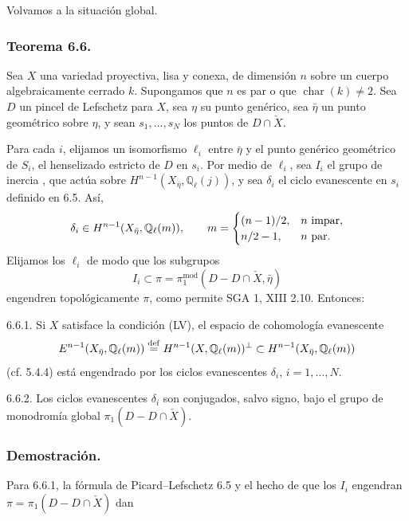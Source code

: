 Volvamos a la situación global.

\subsubsection*{Teorema 6.6.}

Sea $X$ una variedad proyectiva, lisa y conexa, de dimensión $n$ sobre
un cuerpo algebraicamente cerrado $k$. Supongamos que $n$ es par o que
$\operatorname{char}(k)\ne2$. Sea $D$ un pincel de Lefschetz para $X$,
sea $\eta$ su punto genérico, sea $\bar\eta$ un punto geométrico sobre
$\eta$, y sean $s_1,\ldots,s_N$ los puntos de $D\cap\check X$.

\pageoriginale

Para cada $i$, elijamos un isomorfismo $\ell_i$ entre $\bar\eta$ y el
punto genérico geométrico de $S_i$, el henselizado estricto de $D$ en
$s_i$. Por medio de $\ell_i$, sea $I_i$ el grupo de inercia
, que actúa sobre
$H^{n-1}(X_{\bar\eta},\mathbb Q_\ell(j))$, y sea $\delta_i$ el ciclo
evanescente en $s_i$ definido en 6.5. Así,
\[
\delta_i\in
\sisi{H^{n-1}(X,\mathbb Q_\ell(m)}
{H^{n-1}(X_{\bar\eta},\mathbb Q_\ell(m))},
\qquad
m=\begin{cases}
(n-1)/2,& n\text{ impar},\\
n/2-1,& n\text{ par}.
\end{cases}
\]
Elijamos los $\ell_i$ de modo que los subgrupos
\[
I_i\subset
\pi=\pi_1^{\mathrm{mod}}(D-D\cap\check X,\bar\eta)
\]
engendren topológicamente $\pi$, como permite SGA 1, XIII 2.10.
Entonces:

\medskip
\noindent
\textup{6.6.1.} Si $X$ satisface la condición (LV), el espacio de
cohomología evanescente
\[
\sisi{E^{n-1}(X_{\bar\eta},\mathbb Q_\ell(m)}
{E^{n-1}(X_{\bar\eta},\mathbb Q_\ell(m))}
\stackrel{\mathrm{def}}{=}
H^{n-1}(X,\mathbb Q_\ell(m))^\perp
\subset H^{n-1}(X_{\bar\eta},\mathbb Q_\ell(m))
\]
(cf. 5.4.4) está engendrado por los ciclos evanescentes
$\delta_i$, $i=1,\ldots,N$.

\medskip
\noindent
\textup{6.6.2.} Los ciclos evanescentes $\delta_i$ son conjugados,
salvo signo, bajo el grupo de monodromía global
$\pi_1(D-D\cap\check X)$.

\subsubsection*{Demostración.}

Para 6.6.1, la fórmula de Picard--Lefschetz 6.5 y el hecho de que los
$I_i$ engendran $\pi=\pi_1(D-D\cap\check X)$ dan

